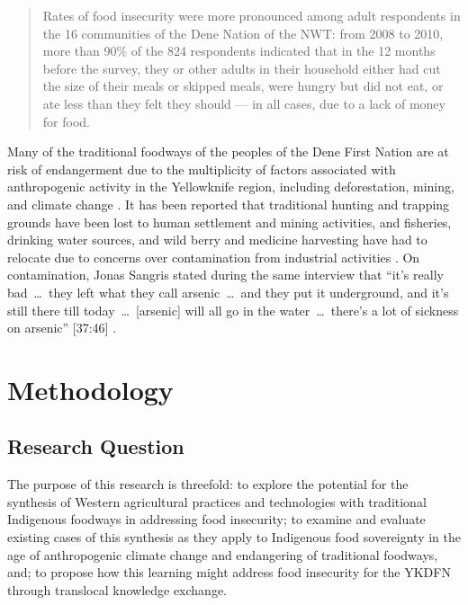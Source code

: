 \documentclass{report}
\begin{document}
\begin{quote}
  Rates of food insecurity were more pronounced among adult respondents in the 16 communities of the Dene Nation of the NWT: from 2008 to 2010, more than 90\% of the 824 respondents indicated that in the 12 months before the survey, they or other adults in their household either had cut the size of their meals or skipped meals, were hungry but did not eat, or ate less than they felt they should — in all cases, due to a lack of money for food. \parencite[42]{aboriginalfoodsecurity}
\end{quote} %

\hspace{24pt} Many of the traditional foodways of the peoples of the Dene First Nation are at risk of endangerment due to the multiplicity of factors associated with anthropogenic activity in the Yellowknife region, including deforestation, mining, and climate change \parencite{denefoodwaysontologies}.
It has been reported that traditional hunting and trapping grounds have been lost to human settlement and mining activities, and fisheries, drinking water sources, and wild berry and medicine harvesting have had to relocate due to concerns over contamination from industrial activities \parencite{riskperceptions}.
On contamination, Jonas Sangris stated during the same interview that ``it's really bad~\ldots~they left what they call arsenic~\ldots~and they put it underground, and it's still there till today~\ldots~[arsenic] will all go in the water~\ldots~there's a lot of sickness on arsenic'' [37:46] \parencite{jonassangris}.

\section{Methodology}

\subsection{Research Question}

\hspace{24pt} The purpose of this research is threefold:
to explore the potential for the synthesis of Western agricultural practices and technologies with traditional Indigenous foodways in addressing food insecurity;
to examine and evaluate existing cases of this synthesis as they apply to Indigenous food sovereignty in the age of anthropogenic climate change and endangering of traditional foodways, and;
to propose how this learning might address food insecurity for the YKDFN through translocal knowledge exchange.
\end{document}
